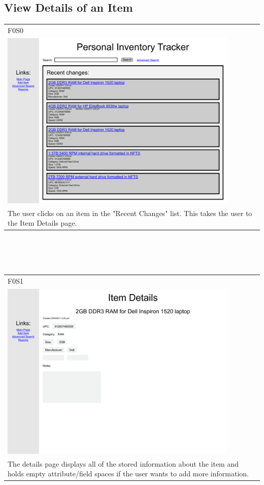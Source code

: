 \documentclass{article}
\begin{document}
\subsection{View Details of an Item}
\begin{tabular}{ p{4.5in} }
F0S0\\
\includegraphics[keepaspectratio, width=4.5in]{viewDetailsF0S0.pdf} \\
The user clicks on an item in the "Recent Changes" list. This takes the user to the Item Details page.
\end{tabular}\\
~\\
~\\
\begin{tabular}{ p{4.5in} }
F0S1\\
\includegraphics[keepaspectratio, width=4.5in]{viewDetailsF0S1.pdf} \\
The details page displays all of the stored information about the item and holds empty attribute/field spaces if the user wants to add more information.
\end{tabular}
\end{document}
